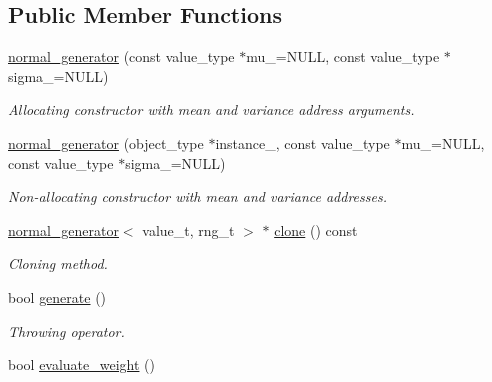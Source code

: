 \subsection*{Public Member Functions}
\begin{DoxyCompactItemize}
\item 
\hypertarget{a00385_a5fa68e1fc9f59a63e44c982067d7b1de}{}\hyperlink{a00385_a5fa68e1fc9f59a63e44c982067d7b1de}{normal\+\_\+generator} (const value\+\_\+type $\ast$mu\+\_\+=N\+U\+L\+L, const value\+\_\+type $\ast$sigma\+\_\+=N\+U\+L\+L)\label{a00385_a5fa68e1fc9f59a63e44c982067d7b1de}

\begin{DoxyCompactList}\small\item\em Allocating constructor with mean and variance address arguments. \end{DoxyCompactList}\item 
\hypertarget{a00385_a7e29a2228ed20c64bd191d35eb64256e}{}\hyperlink{a00385_a7e29a2228ed20c64bd191d35eb64256e}{normal\+\_\+generator} (object\+\_\+type $\ast$instance\+\_\+, const value\+\_\+type $\ast$mu\+\_\+=N\+U\+L\+L, const value\+\_\+type $\ast$sigma\+\_\+=N\+U\+L\+L)\label{a00385_a7e29a2228ed20c64bd191d35eb64256e}

\begin{DoxyCompactList}\small\item\em Non-\/allocating constructor with mean and variance addresses. \end{DoxyCompactList}\item 
\hypertarget{a00385_a2dbac3922bbf37727f61efecfcea45d8}{}\hyperlink{a00385}{normal\+\_\+generator}$<$ value\+\_\+t, rng\+\_\+t $>$ $\ast$ \hyperlink{a00385_a2dbac3922bbf37727f61efecfcea45d8}{clone} () const \label{a00385_a2dbac3922bbf37727f61efecfcea45d8}

\begin{DoxyCompactList}\small\item\em Cloning method. \end{DoxyCompactList}\item 
\hypertarget{a00385_abe9367101dcd82fa1b9026634c4ec3b6}{}bool \hyperlink{a00385_abe9367101dcd82fa1b9026634c4ec3b6}{generate} ()\label{a00385_abe9367101dcd82fa1b9026634c4ec3b6}

\begin{DoxyCompactList}\small\item\em Throwing operator. \end{DoxyCompactList}\item 
\hypertarget{a00385_a09309bb03c9e37d685f547c9ce8532b8}{}bool \hyperlink{a00385_a09309bb03c9e37d685f547c9ce8532b8}{evaluate\+\_\+weight} ()\label{a00385_a09309bb03c9e37d685f547c9ce8532b8}


\end{DoxyCompactItemize}
